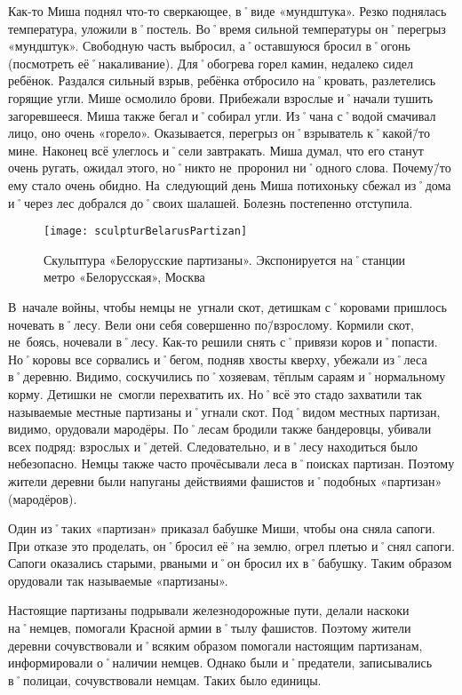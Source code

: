 Как-то Миша поднял что-то сверкающее, в˚виде «мундштука». Резко поднялась температура, уложили в˚постель. Во˚время сильной температуры он˚перегрыз «мундштук». Свободную часть выбросил, а˚оставшуюся бросил в˚огонь (посмотреть её˚накаливание). Для˚обогрева горел камин, недалеко сидел ребёнок. Раздался сильный взрыв, ребёнка отбросило на˚кровать, разлетелись горящие угли. Мише осмолило брови. Прибежали взрослые и˚начали тушить загоревшееся. Миша также бегал и˚собирал угли. Из˚чана с˚водой смачивал лицо, оно очень «горело». Оказывается, перегрыз он˚взрыватель к˚какой\=/то мине. Наконец всё улеглось и˚сели завтракать. Миша думал, что его станут очень ругать, ожидал этого, но˚никто не~проронил ни˚одного слова. Почему\=/то ему стало очень обидно. На~следующий день Миша потихоньку сбежал из˚дома и˚через лес добрался до˚своих шалашей. Болезнь постепенно отступила. 

\begin{wrapfigure}{O}{.4\textwidth}
\centering
\texttt{[image: sculpturBelarusPartizan]}
\caption{Скульптура «Белорусские партизаны». Экспонируется на˚станции метро «Белорусская», Москва}
\label{fig:sculpturBelarusPartizan}
\end{wrapfigure}

В~начале войны, чтобы немцы не~угнали скот, детишкам с˚коровами пришлось ночевать в˚лесу. Вели они себя совершенно по\=/взрослому. Кормили скот, не~боясь, ночевали в˚лесу. Как-то решили снять с˚привязи коров и˚попасти. Но˚коровы все сорвались и˚бегом, подняв хвосты кверху, убежали из˚леса в˚деревню. Видимо, соскучились по˚хозяевам, тёплым сараям и˚нормальному корму. Детишки не~смогли перехватить их. Но˚всё это стадо захватили так называемые местные партизаны и˚угнали скот. Под˚видом местных партизан, видимо, орудовали мародёры. По˚лесам бродили также бандеровцы, убивали всех подряд: взрослых и˚детей. Следовательно, и в˚лесу находиться было небезопасно. Немцы также часто прочёсывали леса в˚поисках партизан. Поэтому жители деревни были напуганы действиями фашистов и˚подобных «партизан» (мародёров). 

Один из˚таких «партизан» приказал бабушке Миши, чтобы она сняла сапоги. При отказе это проделать, он˚бросил её˚на землю, огрел плетью и˚снял сапоги. Сапоги оказались старыми, рваными и˚он бросил их в˚бабушку. Таким образом орудовали так называемые «партизаны».

Настоящие партизаны подрывали железнодорожные пути, делали наскоки на˚немцев, помогали Красной армии в˚тылу фашистов. Поэтому жители деревни сочувствовали и˚всяким образом помогали настоящим партизанам, информировали о˚наличии немцев. Однако были и˚предатели, записывались в˚полицаи, сочувствовали немцам. Таких было единицы. 

